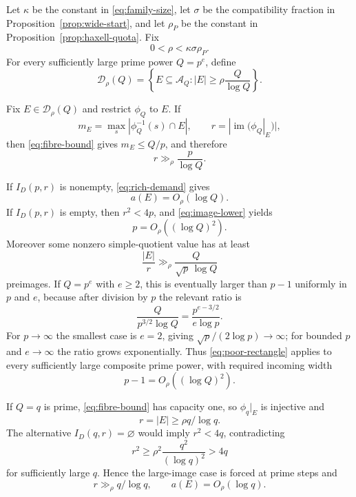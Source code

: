 Let $\kappa$ be the constant in \eqref{eq:family-size}, let $\sigma$ be the compatibility fraction in Proposition~\ref{prop:wide-start}, and let $\rho_P$ be the constant in Proposition~\ref{prop:haxell-quota}.  Fix
\begin{equation}\label{eq:rho-choice}
0<\rho<\kappa\sigma\rho_P.
\end{equation}
For every sufficiently large prime power $Q=p^e$, define
\begin{equation}\label{eq:adm-universal}
\mathcal D_\rho(Q)=
\left\{
E\subseteq\mathcal A_Q:
|E|\ge \rho\frac Q{\log Q}
\right\}.
\end{equation}

Fix $E\in\mathcal D_\rho(Q)$ and restrict $\phi_Q$ to $E$.  If
\[
m_E=\max_s|\phi_Q^{-1}(s)\cap E|,
\qquad
r=|\operatorname{im}(\phi_Q|_E)|,
\]
then \eqref{eq:fibre-bound} gives $m_E\le Q/p$, and therefore
\begin{equation}\label{eq:image-lower}
r\gg_\rho\frac p{\log Q}.
\end{equation}

If $I_D(p,r)$ is nonempty, \eqref{eq:rich-demand} gives
\begin{equation}\label{eq:rich-demand-log}
a(E)=O_\rho(\log Q).
\end{equation}
If $I_D(p,r)$ is empty, then $r^2<4p$, and \eqref{eq:image-lower} yields
\begin{equation}\label{eq:poor-p-bound}
p=O_\rho((\log Q)^2).
\end{equation}
Moreover some nonzero simple-quotient value has at least
\begin{equation}\label{eq:heavy-fibre}
\frac{|E|}{r}
\gg_\rho\frac{Q}{\sqrt p\,\log Q}
\end{equation}
preimages.  If $Q=p^e$ with $e\ge2$, this is eventually larger than $p-1$ uniformly in $p$ and $e$, because after division by $p$ the relevant ratio is
\begin{equation}\label{eq:heavy-ratio}
\frac{Q}{p^{3/2}\log Q}
=
\frac{p^{e-3/2}}{e\log p}.
\end{equation}
For $p\to\infty$ the smallest case is $e=2$, giving $\sqrt p/(2\log p)\to\infty$; for bounded $p$ and $e\to\infty$ the ratio grows exponentially.  Thus \eqref{eq:poor-rectangle} applies to every sufficiently large composite prime power, with required incoming width
\[
p-1=O_\rho((\log Q)^2).
\]

If $Q=q$ is prime, \eqref{eq:fibre-bound} has capacity one, so $\phi_q|_E$ is injective and
\[
r=|E|\ge \rho q/\log q.
\]
The alternative $I_D(q,r)=\varnothing$ would imply $r^2<4q$, contradicting
\[
r^2\ge \rho^2\frac{q^2}{(\log q)^2}>4q
\]
for sufficiently large $q$.  Hence the large-image case is forced at prime steps and
\begin{equation}\label{eq:prime-rich}
r\gg_\rho q/\log q,
\qquad
a(E)=O_\rho(\log q).
\end{equation}

